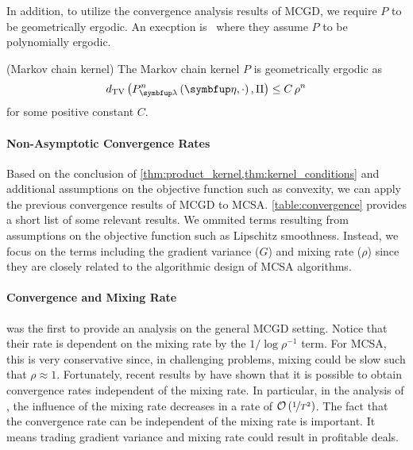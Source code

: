 In addition, to utilize the convergence analysis results of MCGD, we require \(P\) to be geometrically ergodic.
An execption is~\citet{debavelaere_convergence_2021} where they assume \(P\) to be polynomially ergodic.
\begin{assumption}{(Markov chain kernel)}\label{thm:kernel_conditions}
\vspace{-0.05in}
  The Markov chain kernel \(P\) is geometrically ergodic as
  {%
  \[
  \DTV{P_{\vlambda}^{n}\left(\veta, \cdot\right)}{ \Pi } \leq C \, \rho^{n}
  \]
  }
  for some positive constant \(C\).
\vspace{-0.05in}
\end{assumption}
\vspace{-0.05in}

\vspace{-0.05in}
\paragraph{Non-Asymptotic Convergence Rates}
Based on the conclusion of \cref{thm:product_kernel,thm:kernel_conditions} and additional assumptions on the objective function such as convexity, we can apply the previous convergence results of MCGD to MCSA.
\cref{table:convergence} provides a short list of some relevant results.
We ommited terms resulting from assumptions on the objective function such as Lipschitz smoothness.
Instead, we focus on the terms including the gradient variance (\(G\)) and mixing rate (\(\rho\)) since they are closely related to the algorithmic design of MCSA algorithms.

\vspace{-0.05in}
\paragraph{Convergence and Mixing Rate}
\citet{duchi_ergodic_2012} was the first to provide an analysis on the general MCGD setting.
Notice that their rate is dependent on the mixing rate by the \(1 / \log \rho^{-1}\) term.
For MCSA, this is very conservative since, in challenging problems, mixing could be slow such that \(\rho \approx 1\).
Fortunately, recent results by \citet{doan_convergence_2020,doan_finitetime_2020} have shown that it is possible to obtain convergence rates independent of the mixing rate.
In particular, in the analysis of \citet{doan_finitetime_2020}, the influence of the mixing rate decreases in a rate of \(\mathcal{O}\left(\nicefrac{1}{T^2}\right)\).
The fact that the convergence rate can be independent of the mixing rate is important.
It means trading gradient variance and mixing rate could result in profitable deals.

